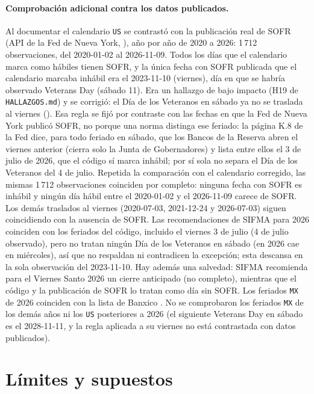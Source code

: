 \begin{sloppypar}
\paragraph{Comprobación adicional contra los datos publicados.} Al documentar el calendario \texttt{US} se
contrastó con la publicación real de SOFR (API de la Fed de Nueva York, \citealt{nyfed2026}), año por año de
2020 a 2026: 1\,712 observaciones, del 2020-01-02 al 2026-11-09. Todos los días que el calendario marca como
hábiles tienen SOFR, y la única fecha con SOFR publicada que el calendario marcaba inhábil era el 2023-11-10
(viernes), día en que se habría observado Veterans Day (sábado 11). Era un hallazgo de bajo impacto (H19 de
\texttt{HALLAZGOS.md}) y se corrigió: el Día de los Veteranos en sábado ya no se traslada al viernes
(). Esa regla se fijó por contraste con las fechas en que la Fed de
Nueva York publicó SOFR, no porque una norma distinga ese feriado: la página K.8 de la Fed \citep{frb2026} dice, para
todo feriado en sábado, que los Bancos de la Reserva abren el viernes anterior (cierra solo la Junta de Gobernadores)
y lista entre ellos el 3 de julio de 2026, que el código sí marca inhábil; por sí sola no separa el Día de los Veteranos
del 4 de julio. Repetida la comparación con el calendario corregido, las mismas
1\,712 observaciones coinciden por completo: ninguna fecha con SOFR es inhábil y ningún día hábil entre el 2020-01-02
y el 2026-11-09 carece de SOFR. Los demás traslados al viernes (2020-07-03, 2021-12-24 y 2026-07-03) siguen
coincidiendo con la ausencia de SOFR. Las recomendaciones de SIFMA para 2026 \citep{sifma2026} coinciden con los feriados del
código, incluido el viernes 3 de julio (4 de julio observado), pero no tratan ningún Día de los Veteranos en sábado
(en 2026 cae en miércoles), así que no respaldan ni contradicen la excepción; esta descansa en la sola observación del
2023-11-10. Hay además una salvedad: SIFMA recomienda para el Viernes Santo 2026 un cierre anticipado (no completo),
mientras que el código y la publicación de SOFR lo tratan como día sin SOFR. Los feriados \texttt{MX} de 2026
coinciden con la lista de Banxico \citep{banxico2026c}. No se comprobaron los feriados \texttt{MX} de los
demás años ni los \texttt{US} posteriores a 2026 (el siguiente Veterans Day en sábado es el 2028-11-11, y la regla aplicada
a su viernes no está contrastada con datos publicados).

\section{Límites y supuestos}\label{sec:cap01-limites}


\end{sloppypar}
